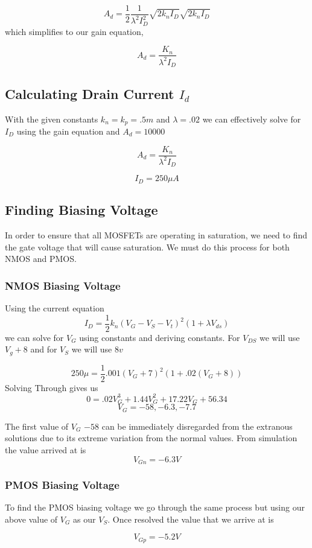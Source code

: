 \documentclass[12pt]{article}
\begin{document}
	
	$$A_d = \frac{1}{2} \frac{1}{\lambda^2 I_D^2} \sqrt{2 k_n I_D} \sqrt{2 k_n I_D}$$
	which simplifies to our gain equation,
	
	$$A_d  = \frac{K_n}{\lambda^2 I_D}$$
	
	\subsection{Calculating Drain Current $I_d$}
	With the given constants $k_n = k_p = .5m$ and $\lambda = .02$ we can effectively solve for $I_D$ using the gain equation and $A_d = 10000$
	
	$$A_d  = \frac{K_n}{\lambda^2 I_D}$$
	
	
	
	$$I_D = 250\mu A$$
	
	\subsection{Finding Biasing Voltage}
	In order to ensure that all MOSFETs are operating in saturation, we need to find the gate voltage that will cause saturation. We must do this process for both NMOS and PMOS.
	\subsubsection{NMOS Biasing Voltage} 
	Using the current equation 
	$$I_D = \frac{1}{2} k_n (V_G -V_S - V_t)^2 (1 + \lambda V_{ds})$$
	we can solve for $V_G$ using constants and deriving constants. For $V_{DS}$ we will use $V_g + 8$ and for $V_S$ we will use $8v$
	
	$$250 \mu = \frac{1}{2} .001 (V_G + 7)^2 (1+.02(V_G + 8))$$
	 Solving Through gives us 
	 $$0 = .02V_G^3 + 1.44V_G^2 + 17.22V_G + 56.34$$
	 $$V_G = -58, -6.3 , -7.7$$
	 
	 The first value of $V_G$ $-58$ can be immediately disregarded from the extranous solutions due to its extreme variation from the normal values. From simulation the value arrived at is $$V_{Gn} = -6.3V$$
	 
	\subsubsection{PMOS Biasing Voltage}
	
	To find the PMOS biasing voltage we go through the same process but using our above value of $V_G$ as our $V_S$. Once resolved the value that we arrive at is
	
	$$V_{Gp} = -5.2V$$
	
\end{document}
